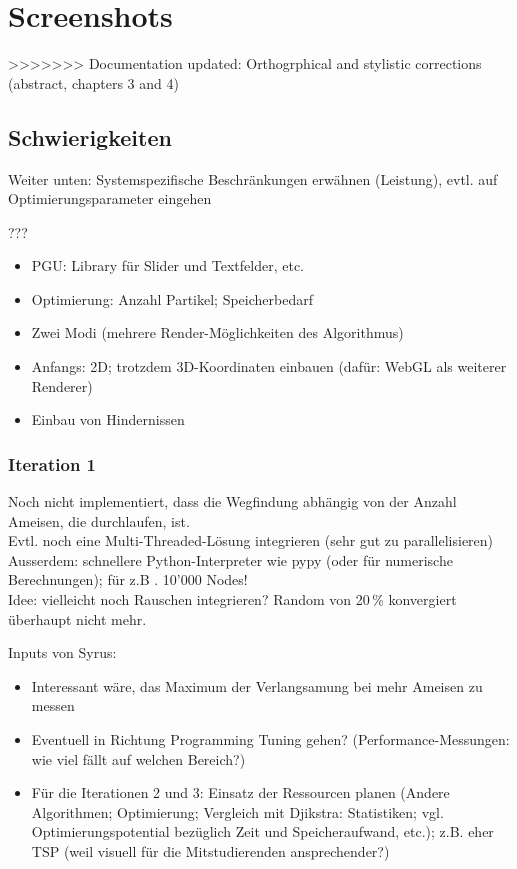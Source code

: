 \section{Screenshots}
>>>>>>> Documentation updated: Orthogrphical and stylistic corrections (abstract, chapters 3 and 4)

\subsection{Schwierigkeiten}

Weiter unten: Systemspezifische Beschränkungen erwähnen (Leistung), evtl. auf Optimierungsparameter eingehen

???
\begin{itemize}[noitemsep]
\item PGU: Library für Slider und Textfelder, etc.
\item Optimierung: Anzahl Partikel; Speicherbedarf
\item Zwei Modi (mehrere Render-Möglichkeiten des Algorithmus)
\item Anfangs: 2D; trotzdem 3D-Koordinaten einbauen (dafür: WebGL als weiterer Renderer)
\item Einbau von Hindernissen
\end{itemize}

\subsubsection*{Iteration 1}

Noch nicht implementiert, dass die Wegfindung abhängig von der Anzahl Ameisen, die durchlaufen, ist. \\

Evtl. noch eine Multi-Threaded-Lösung integrieren (sehr gut zu parallelisieren) \\

Ausserdem: schnellere Python-Interpreter wie pypy (oder für numerische Berechnungen); für z.B . 10'000 Nodes! \\

Idee: vielleicht noch Rauschen integrieren? Random von 20\,\% konvergiert überhaupt nicht mehr.

\vspace*{3cm}


Inputs von Syrus: \\

\begin{itemize}
\item Interessant wäre, das Maximum der Verlangsamung bei mehr Ameisen zu messen
\item Eventuell in Richtung Programming Tuning gehen? (Performance-Messungen: wie viel fällt auf welchen Bereich?) 
\item Für die Iterationen 2 und 3: Einsatz der Ressourcen planen (Andere Algorithmen; Optimierung; Vergleich mit Djikstra: Statistiken; vgl. Optimierungspotential bezüglich Zeit und Speicheraufwand, etc.); z.B. eher TSP (weil visuell für die Mitstudierenden ansprechender?) 
\end{itemize}